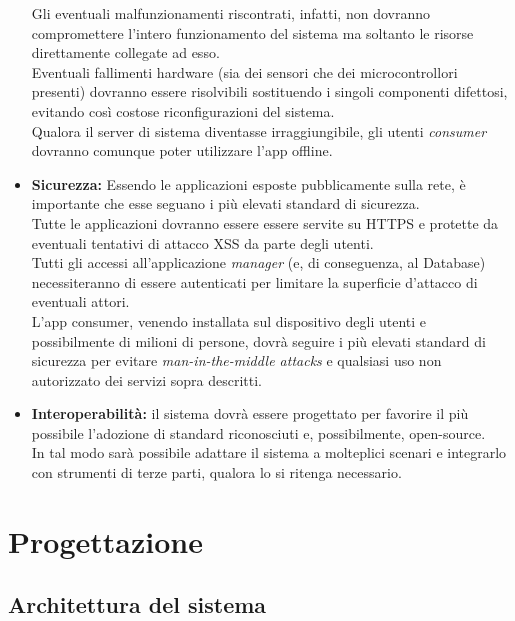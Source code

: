 \documentclass[12pt]{article}
\begin{document}
\begin{itemize}
Gli eventuali malfunzionamenti riscontrati, infatti, non dovranno compromettere l'intero funzionamento del sistema ma soltanto le risorse direttamente collegate ad esso.\\ 
Eventuali fallimenti hardware (sia dei sensori che dei microcontrollori presenti) dovranno essere risolvibili sostituendo i singoli componenti difettosi, evitando così costose riconfigurazioni del sistema.\\
Qualora il server di sistema diventasse irraggiungibile, gli utenti \textit{consumer} dovranno comunque poter utilizzare l'app offline.

\item \textbf{Sicurezza:} Essendo le applicazioni esposte pubblicamente sulla rete, è importante che esse seguano i più elevati standard di sicurezza.\\
Tutte le applicazioni dovranno essere essere servite su HTTPS e protette da eventuali tentativi di attacco XSS da parte degli utenti.\\
Tutti gli accessi all'applicazione \textit{manager} (e, di conseguenza, al Database) necessiteranno di essere autenticati per limitare la superficie d'attacco di eventuali attori.\\
L'app consumer, venendo installata sul dispositivo degli utenti e possibilmente di milioni di persone, dovrà seguire i più elevati standard di sicurezza per evitare \textit{man-in-the-middle attacks} e qualsiasi uso non autorizzato dei servizi sopra descritti.

\item \textbf{Interoperabilità:} il sistema dovrà essere progettato per favorire il più possibile l'adozione di standard riconosciuti e, possibilmente, open-source.\\
In tal modo sarà possibile adattare il sistema a molteplici scenari e integrarlo con strumenti di terze parti, qualora lo si ritenga necessario.
\end{itemize}
\newpage
\section{Progettazione}
\subsection{Architettura del sistema}
\end{document}
